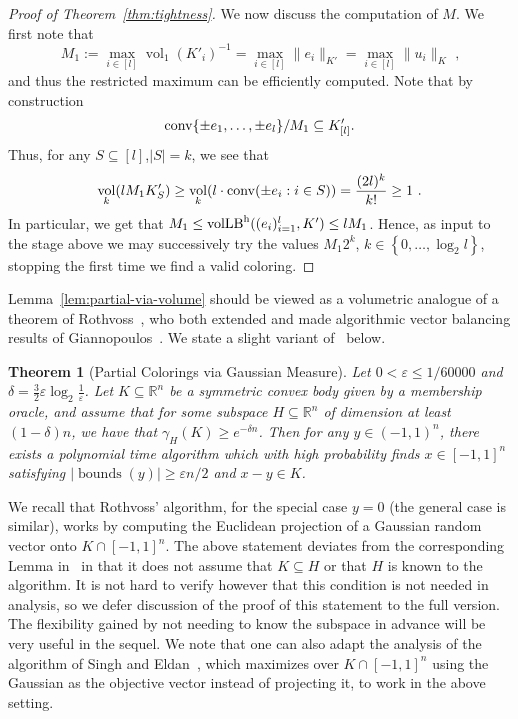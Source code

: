 \documentclass[11pt]{article}
\newtheorem{theorem}{Theorem}
\newcommand{\R}{{\mathbb{R}}}
\newcommand\eps{\varepsilon}
\newcommand{\set}[1]{\left\{ #1 \right\}}
\DeclareMathOperator{\vollb}{volLB}
\DeclareMathOperator{\vol}{vol}
\DeclareMathOperator{\bnds}{bounds}
\newcommand{\notename}[2]{{\textcolor{red}{{\bf (#1:} {#2}{\bf ) }}}}
\newcommand{\notename}[2]{{\textcolor{red}{\footnotesize{\bf (#1:} {#2}{\bf ) }}}}
\newcommand{\dnote}[1]{{\notename{Daniel}{#1}}}
\newcommand{\notename}[2]{{}}
\newcommand{\dnote}[1]{}
\begin{document}
\begin{proof}[Proof of Theorem~\ref{thm:tightness}]
We now discuss the computation of $M$. We first note that 
\[
M_1 := \max_{i \in [l]} \vol_1(K'_i)^{-1} = \max_{i \in [l]} \|e_i\|_{K'} =
\max_{i \in [l]} \|u_i\|_K \text{ ,}
\]
and thus the restricted maximum can be efficiently computed. Note that by
construction \[{\rm conv}\{\pm e_1,\dots, \pm e_l\}/M_1 \subseteq K'_{[l]}.\] Thus,
for any $S \subseteq [l]$,$|S|=k$, we see that
\[
\vol_k(l M_1 K'_S) \geq \vol_{k}(l \cdot {\rm conv}(\pm e_i: i \in S)) = \frac{(2l)^k}{k!}
 \geq 1 \text{ .}
\]
In particular, we get that $M_1 \leq \vollb^{\rm h}((e_i)_{i=1}^l,K') \leq l M_1$.
Hence, as input to the stage above we may successively try the values $M_1
2^k$, $k \in \set{0,\dots,\log_2 l}$, stopping the first time we find a valid
coloring. 
\end{proof}

Lemma~\ref{lem:partial-via-volume} should be viewed as a volumetric analogue of
a theorem of Rothvoss~\cite{rothvoss-giann}, who both extended and made
algorithmic vector balancing results of Giannopoulos~\cite{giannop}. We state a
slight variant of~\cite[Lemma 9]{rothvoss-giann} below.


\begin{theorem}[Partial Colorings via Gaussian Measure]\label{thm:roth-giann}
Let $0 < \eps \leq 1/60000$ and $\delta = \frac{3}{2}\eps \log_2
\frac{1}{\eps}$. Let $K \subseteq \R^n$ be a symmetric convex body given by a
membership oracle, and assume that for some subspace $H \subseteq \R^n$ of
dimension at least $(1-\delta)n$, we have that $\gamma_H(K) \geq e^{-\delta n}$.
Then for any $y \in (-1,1)^n$, there exists a polynomial time algorithm which
with high probability finds $x \in [-1,1]^n$ satisfying $|\bnds(y)| \geq \eps
n/2$ and $x-y \in K$.
\end{theorem}

We recall that Rothvoss' algorithm, for the special case $y = 0$ (the general
case is similar), works by computing the Euclidean projection of a Gaussian
random vector onto $K \cap [-1,1]^n$. The above statement deviates from the
corresponding Lemma in~\cite{rothvoss-giann} in that it does not assume that $K
\subseteq H$ or that $H$ is known to the algorithm. It is not hard to verify
however that this condition is not needed in analysis, so we defer discussion of
the proof of this statement to the full version. The flexibility gained by not
needing to know the subspace in advance will be very useful in the sequel. We
note that one can also adapt the analysis of the algorithm of Singh and
Eldan~\cite{ES14}, which maximizes over $K \cap [-1,1]^n$ using the Gaussian as
the objective vector instead of projecting it, to work in the above setting.   
\end{document}
